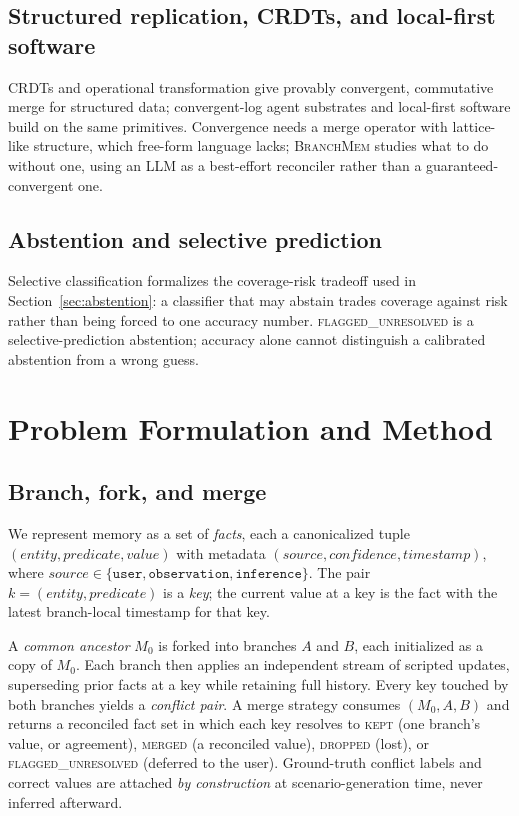 \documentclass[11pt]{article}
\begin{document}
\subsection{Structured replication, CRDTs, and local-first software}
CRDTs \citep{shapiro2011crdt} and operational transformation
\citep{ellis1989concurrency} give provably convergent, commutative merge
for structured data; convergent-log agent substrates \citep{sarkar2026grite}
and local-first software \citep{kleppmann2019localfirst} build on the same
primitives. Convergence needs a merge operator with lattice-like structure,
which free-form language lacks; \textsc{BranchMem} studies what to do
without one, using an LLM as a best-effort reconciler rather than a
guaranteed-convergent one.

\subsection{Abstention and selective prediction}
Selective classification \citep{elyaniv2010selective,geifman2017selective}
formalizes the coverage-risk tradeoff used in Section~\ref{sec:abstention}:
a classifier that may abstain trades coverage against risk rather than
being forced to one accuracy number. \textsc{flagged\_unresolved} is a
selective-prediction abstention; accuracy alone cannot distinguish a
calibrated abstention from a wrong guess.

\section{Problem Formulation and Method}

\subsection{Branch, fork, and merge}
\label{sec:formulation}

We represent memory as a set of \emph{facts}, each a canonicalized tuple
$(\textit{entity}, \textit{predicate}, \textit{value})$ with metadata
$(\textit{source}, \textit{confidence}, \textit{timestamp})$, where
$\textit{source}\in\{\texttt{user}, \texttt{observation}, \texttt{inference}\}$.
The pair $k=(\textit{entity},\textit{predicate})$ is a \emph{key}; the current
value at a key is the fact with the latest branch-local timestamp for that key.

A \emph{common ancestor} $M_0$ is forked into branches $A$ and $B$, each
initialized as a copy of $M_0$. Each branch then applies an independent
stream of scripted updates, superseding prior facts at a key while retaining
full history. Every key touched by both branches yields a \emph{conflict
pair}. A merge strategy consumes $(M_0, A, B)$ and returns a reconciled fact
set in which each key resolves to \textsc{kept} (one branch's value, or
agreement), \textsc{merged} (a reconciled value), \textsc{dropped} (lost), or
\textsc{flagged\_unresolved} (deferred to the user). Ground-truth conflict
labels and correct values are attached \emph{by construction} at
scenario-generation time, never inferred afterward.
\end{document}

